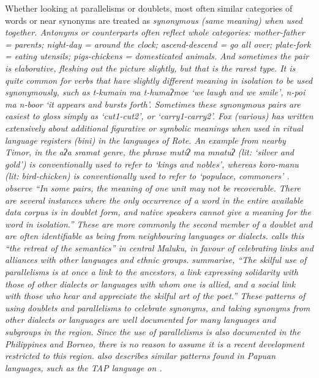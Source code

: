 Whether looking at parallelisms or doublets,
most often similar categories of words or near synonyms are treated
as \it{synonymous} (same meaning) when used together.
Antonyms or \it{counterparts} often reflect whole categories:
mother-father = parents; night-day = around the clock; ascend-descend
= go all over; plate-fork = eating utensils; pigs-chickens = domesticated animals.
And sometimes the pair is \it{elaborative},
fleshing out the picture slightly,
but that is the rarest type.
It is quite common for verbs that have slightly different meaning
in isolation to be used synonymously,
such as   \it{t-kumain ma t-humaʔmoe} ‘we laugh
and we smile’, \it{n-poi ma n-boor} ‘it appears and bursts forth’.
Sometimes these synonymous pairs are easiest to gloss simply
as ‘cut1-cut2’, or ‘carry1-carry2’.
Fox (various) has written extensively about additional figurative
or symbolic meanings when used in ritual language registers (\it{bini})
in the languages of Rote.
An example from nearby Timor,
in the   \it{aʔa sramat} genre,
the phrase \it{mutiʔ ma mnatuʔ} (lit: ‘silver
and gold’) is conventionally used to refer to ‘kings
and nobles’, whereas \it{koro-manu} (lit: bird-chicken) is conventionally
used to refer to ‘populace, commoners’ \citep{GrimesBIP}.
\citet[28]{GrimesTherikGrimesJacob1997} observe “In some pairs,
the meaning of one unit may not be recoverable.
There are several instances where the only occurrence of a word
in the entire available data corpus is in doublet form,
and native speakers \it{cannot} give a meaning for the word in
isolation.” These are more commonly the second member of a doublet
and are often identifiable as being from neighbouring languages or dialects.
\citet{Valeri1990} calls this “the retreat of the semantics”
in central Maluku, in favour of celebrating links
and alliances with other languages
and ethnic groups. \citet[30]{GrimesTherikGrimesJacob1997}
summarise, “The skilful use of parallelisms is at once
a link to the ancestors,
a link expressing solidarity with those of other dialects or
languages with whom one is allied,
and a social link with those who hear
and appreciate the skilful art of the poet.” These patterns of
using doublets and parallelisms to celebrate synonyms,
and taking synonyms from other dialects or languages are well
documented for many languages
and subgroups in the region.
Since the use of parallelisms is also documented in the Philippines
and Borneo, there is no reason to assume it is a recent development
restricted to this region.
\citet{GrimesBIP} also describes similar patterns found in Papuan
languages, such as the TAP language  on .

